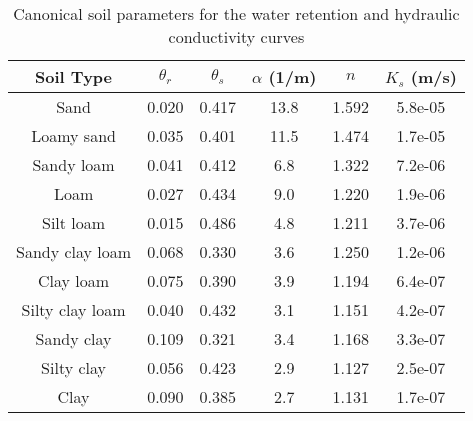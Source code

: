 \begin{table}[ht]
\caption{Canonical soil parameters for the water retention and hydraulic conductivity curves \citep{van1991retc}}
\label{table:van-genuchten}
  \begin{tabular*}{\textwidth}{c @{\extracolsep{\fill}} ccccc}
    \hline
    Soil Type        & $\theta_r$  &  $\theta_s$  &  $\alpha$ (1/m)  &  $n$  &   $K_s$ (m/s) \\
    \hline
    Sand             & 0.020       & 0.417        & 13.8             & 1.592 &     5.8e-05   \\
    Loamy sand       & 0.035       & 0.401        & 11.5             & 1.474 &     1.7e-05   \\
    Sandy loam       & 0.041       & 0.412        & 6.8              & 1.322 &     7.2e-06   \\
    Loam             & 0.027       & 0.434        & 9.0              & 1.220 &     1.9e-06   \\
    Silt loam        & 0.015       & 0.486        & 4.8              & 1.211 &     3.7e-06   \\
    Sandy clay loam  & 0.068       & 0.330        & 3.6              & 1.250 &     1.2e-06   \\
    Clay loam        & 0.075       & 0.390        & 3.9              & 1.194 &     6.4e-07   \\
    Silty clay loam  & 0.040       & 0.432        & 3.1              & 1.151 &     4.2e-07   \\
    Sandy clay       & 0.109       & 0.321        & 3.4              & 1.168 &     3.3e-07   \\
    Silty clay       & 0.056       & 0.423        & 2.9              & 1.127 &     2.5e-07   \\
    Clay             & 0.090       & 0.385        & 2.7              & 1.131 &     1.7e-07   \\
    \hline
  \end{tabular*}
\end{table}
